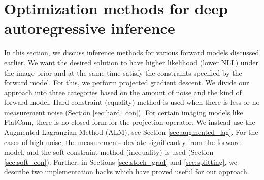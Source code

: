 \documentclass[journal,twoside]{IEEEtran}
\begin{document}
\begin{comment}
Deep prior models used for solving inverse problems differ in the underlying assumptions they make for modelling densities. Chang et al. \cite{chang2017one}, Sonderby et al. \cite{sonderby2016amortised} and Bigdeli et al. \cite{bigdeli2017image} model the relation between the corrupted/noisy/blurred image and the clean image as a whole using deep convolutional networks. These networks are trained using adversarial and auto-encoder based losses to ensure that the output of the network is perceptually close to the clean image. However, there is no direct dependence between the pixels in the output image. This often leads to artifacts in the reconstructions with the value of a few pixels varying abruptly from those of the neighbouring pixels. These artifacts make the images look unnatural as natural images often have high correlation between adjacent pixels. Gao et al. \cite{gao2017pixel} and Bansal et al. \cite{bansal2017pixelnet} also talk about the need of pixel-level deep approaches for the domain of dense classification. 

On the other hand, autoregressive models such as RIDE \cite{theis2015generative}, PixelRNN \cite{van2016pixel} and PixelCNN++ \cite{salimans2017pixelcnn++} model images as a 2D causal grid of pixels. This allows for tractable maximum likelihood estimation of densities. Moreover they explicitly handle the dependencies between pixels by modelling the conditional probability of a pixel given the pixels before it (in a raster scan). By utilizing such models as prior for ill-posed image reconstruction enables us to have better pixel-level consistencies in the reconstructed image. Hence, our reconstructions are better than the state-of-the-art in terms of perceptual quality and quantitative metrics such as PSNR and SSIM.
\end{comment}




\section{Optimization methods for deep autoregressive inference}
In this section, we discuss inference methods for various forward models discussed earlier. We want the desired solution to have higher likelihood (lower NLL) under the image prior and at the same time satisfy the constraints specified by the forward model. For this, we perform projected gradient descent. We divide our approach into three categories based on the amount of noise and the kind of forward model. Hard constraint (equality) method is used when there is less or no measurement noise (Section \ref{sec:hard_con}). For certain imaging models like FlatCam, there is no closed form for the projection operator. We instead use the Augmented Lagrangian Method (ALM), see Section \ref{sec:augmented_lag}. For the cases of high noise, the measurements deviate significantly from the forward model, and the soft constraint method (inequality) is used (Section \ref{sec:soft_con}). Further, in Sections \ref{sec:stoch_grad} and \ref{sec:splitting}, we describe two implementation hacks which have proved useful for our approach. 
\end{document}
